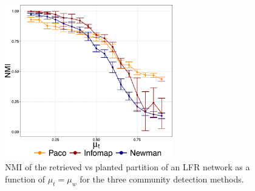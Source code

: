 \begin{figure}[!htb]
\centering
\includegraphics[width=0.65\textwidth]{images/avg_nmi_allmethods_lfr_errorbars.pdf}
\caption{NMI of the retrieved vs planted partition of an LFR network as a function of $\mu_t=\mu_w$ for the three community detection methods.}
\label{fig:avgmutmuw}
\end{figure}

